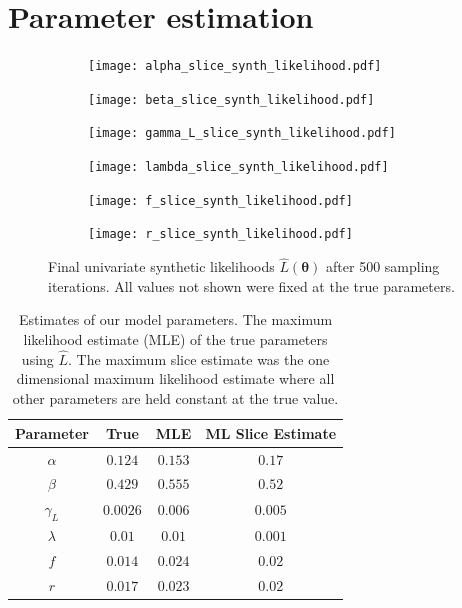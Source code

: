 \section{Parameter estimation}

\begin{figure}[htbp]
    \centering
    \begin{subfigure}[b]{0.5\textwidth}
        \centering
        \texttt{[image: alpha\_slice\_synth\_likelihood.pdf]}
    \end{subfigure}%
    \hfill%
    \begin{subfigure}[b]{0.5\textwidth}
        \centering
        \texttt{[image: beta\_slice\_synth\_likelihood.pdf]}
    \end{subfigure}
    \begin{subfigure}[b]{0.5\textwidth}
        \centering
        \texttt{[image: gamma\_L\_slice\_synth\_likelihood.pdf]}
    \end{subfigure}%
    \hfill%
    \begin{subfigure}[b]{0.5\textwidth}
        \centering
        \texttt{[image: lambda\_slice\_synth\_likelihood.pdf]}
    \end{subfigure}
    \begin{subfigure}[b]{0.5\textwidth}
        \centering
        \texttt{[image: f\_slice\_synth\_likelihood.pdf]}
    \end{subfigure}%
    \hfill%
    \begin{subfigure}[b]{0.5\textwidth}
        \centering
        \texttt{[image: r\_slice\_synth\_likelihood.pdf]}
    \end{subfigure}%
    \caption{
        Final univariate synthetic likelihoods $\hat{L}(\bm{\theta})$ after
        500 sampling iterations. All values not shown were fixed at the true
        parameters.
    }
    \label{fig:final_synth_lik}
\end{figure}

\begin{table}[htbp]
    \caption{
        Estimates of our model parameters.
        The maximum likelihood estimate (MLE) of the true parameters using
        $\hat{L}.$ The maximum slice estimate was the one dimensional
        maximum likelihood estimate where all other parameters are held
        constant at the true value.
    }
    \label{tab:param_est}
    \centering
    \begin{tabular}{c | c | c | c}
        Parameter  & True     & MLE     & ML Slice Estimate \\
        \hline
        $\alpha$   & $0.124$  & $0.153$ & $0.17$            \\
        $\beta $   & $0.429$  & $0.555$ & $0.52$            \\
        $\gamma_L$ & $0.0026$ & $0.006$ & $0.005$           \\
        $\lambda$  & $0.01$   & $0.01$  & $0.001$           \\
        $f$        & $0.014$  & $0.024$ & $0.02$            \\
        $r$        & $0.017$  & $0.023$ & $0.02$            \\
    \end{tabular}
\end{table}

